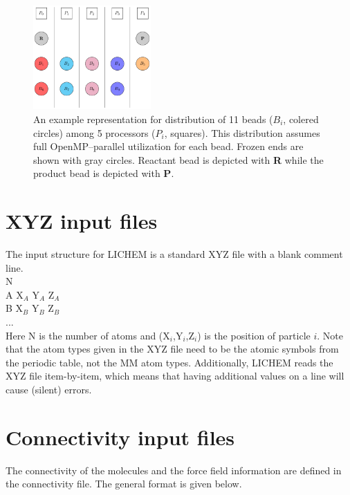 \documentclass[12pt]{report}
\begin{document}
\begin{center}
\begin{figure}[!ht]
\centering
\includegraphics[width=0.4\textwidth]{manual/load_balance.pdf}
\caption{An example representation for distribution of 11 beads
($B_i$, colered circles) among 5 processors ($P_i$, squares).
This distribution assumes full OpenMP--parallel utilization for each
bead.
Frozen ends are shown with gray circles. Reactant bead is depicted with
\textbf{R} while the product bead is depicted with \textbf{P}.}
\label{fig:loadbalance}
\end{figure}
\end{center}

\section{XYZ input files}

The input structure for LICHEM is a standard XYZ file with a blank comment
line. \\

N \\

A  X$_A$  Y$_A$  Z$_A$ \\
B  X$_B$  Y$_B$  Z$_B$ \\
... \\

Here N is the number of atoms and (X$_i$,Y$_i$,Z$_i$) is the position of
particle $i$.
Note that the atom types given in the XYZ file need to be the atomic symbols
from the periodic table, not the MM atom types.
Additionally, LICHEM reads the XYZ file item-by-item, which means that having
additional values on a line will cause (silent) errors.

\section{Connectivity input files}

The connectivity of the molecules and the force field information are defined
in the connectivity file.
The general format is given below. \\
\end{document}
